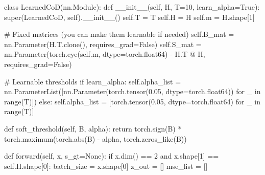 \documentclass[
  letterpaper,
  DIV=11,
  numbers=noendperiod]{scrartcl}
\newenvironment{Shaded}{\begin{snugshade}}{\end{snugshade}}
\newcommand{\BuiltInTok}[1]{\textcolor[rgb]{0.40,0.85,0.94}{#1}}
\newcommand{\CommentTok}[1]{\textcolor[rgb]{0.46,0.44,0.37}{#1}}
\newcommand{\ControlFlowTok}[1]{\textcolor[rgb]{0.98,0.15,0.45}{#1}}
\newcommand{\DecValTok}[1]{\textcolor[rgb]{0.68,0.51,1.00}{#1}}
\newcommand{\FloatTok}[1]{\textcolor[rgb]{0.68,0.51,1.00}{#1}}
\newcommand{\FunctionTok}[1]{\textcolor[rgb]{0.65,0.89,0.18}{#1}}
\newcommand{\KeywordTok}[1]{\textcolor[rgb]{0.98,0.15,0.45}{#1}}
\newcommand{\NormalTok}[1]{\textcolor[rgb]{0.97,0.97,0.95}{#1}}
\newcommand{\OperatorTok}[1]{\textcolor[rgb]{0.97,0.97,0.95}{#1}}
\newcommand{\VariableTok}[1]{\textcolor[rgb]{0.97,0.97,0.95}{#1}}
\begin{document}
\begin{Shaded}
\begin{Highlighting}[]
\KeywordTok{class}\NormalTok{ LearnedCoD(nn.Module):}
    \KeywordTok{def} \FunctionTok{\_\_init\_\_}\NormalTok{(}\VariableTok{self}\NormalTok{, H, T}\OperatorTok{=}\DecValTok{10}\NormalTok{, learn\_alpha}\OperatorTok{=}\VariableTok{True}\NormalTok{):}
        \BuiltInTok{super}\NormalTok{(LearnedCoD, }\VariableTok{self}\NormalTok{).}\FunctionTok{\_\_init\_\_}\NormalTok{()}
        \VariableTok{self}\NormalTok{.T }\OperatorTok{=}\NormalTok{ T}
        \VariableTok{self}\NormalTok{.H }\OperatorTok{=}\NormalTok{ H}
        \VariableTok{self}\NormalTok{.m }\OperatorTok{=}\NormalTok{ H.shape[}\DecValTok{1}\NormalTok{]}

        \CommentTok{\# Fixed matrices (you can make them learnable if needed)}
        \VariableTok{self}\NormalTok{.B\_mat }\OperatorTok{=}\NormalTok{ nn.Parameter(H.T.clone(), requires\_grad}\OperatorTok{=}\VariableTok{False}\NormalTok{)}
        \VariableTok{self}\NormalTok{.S\_mat }\OperatorTok{=}\NormalTok{ nn.Parameter(torch.eye(}\VariableTok{self}\NormalTok{.m, dtype}\OperatorTok{=}\NormalTok{torch.float64) }\OperatorTok{{-}}\NormalTok{ H.T }\OperatorTok{@}\NormalTok{ H, requires\_grad}\OperatorTok{=}\VariableTok{False}\NormalTok{)}

        \CommentTok{\# Learnable thresholds}
        \ControlFlowTok{if}\NormalTok{ learn\_alpha:}
            \VariableTok{self}\NormalTok{.alpha\_list }\OperatorTok{=}\NormalTok{ nn.ParameterList([nn.Parameter(torch.tensor(}\FloatTok{0.05}\NormalTok{, dtype}\OperatorTok{=}\NormalTok{torch.float64)) }\ControlFlowTok{for}\NormalTok{ \_ }\KeywordTok{in} \BuiltInTok{range}\NormalTok{(T)])}
        \ControlFlowTok{else}\NormalTok{:}
            \VariableTok{self}\NormalTok{.alpha\_list }\OperatorTok{=}\NormalTok{ [torch.tensor(}\FloatTok{0.05}\NormalTok{, dtype}\OperatorTok{=}\NormalTok{torch.float64) }\ControlFlowTok{for}\NormalTok{ \_ }\KeywordTok{in} \BuiltInTok{range}\NormalTok{(T)]}

    \KeywordTok{def}\NormalTok{ soft\_threshold(}\VariableTok{self}\NormalTok{, B, alpha):}
        \ControlFlowTok{return}\NormalTok{ torch.sign(B) }\OperatorTok{*}\NormalTok{ torch.maximum(torch.}\BuiltInTok{abs}\NormalTok{(B) }\OperatorTok{{-}}\NormalTok{ alpha, torch.zeros\_like(B))}

    \KeywordTok{def}\NormalTok{ forward(}\VariableTok{self}\NormalTok{, x, s\_gt}\OperatorTok{=}\VariableTok{None}\NormalTok{):}
        \ControlFlowTok{if}\NormalTok{ x.dim() }\OperatorTok{==} \DecValTok{2} \KeywordTok{and}\NormalTok{ x.shape[}\DecValTok{1}\NormalTok{] }\OperatorTok{==} \VariableTok{self}\NormalTok{.H.shape[}\DecValTok{0}\NormalTok{]:}
\NormalTok{            batch\_size }\OperatorTok{=}\NormalTok{ x.shape[}\DecValTok{0}\NormalTok{]}
\NormalTok{            z\_out }\OperatorTok{=}\NormalTok{ []}
\NormalTok{            mse\_list }\OperatorTok{=}\NormalTok{ []}


\end{Highlighting}
\end{Shaded}
\end{document}

